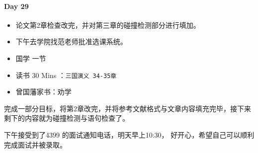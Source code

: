 \documentclass[UTF8,a4paper,8pt]{ctexart}
\begin{document}
 	 \paragraph{Day 29      \quad     }   
	 	 \begin{itemize}[itemindent = 1em]
	 	 	\renewcommand\labelitemi{\makebox[0pt][l]{$\square$}\raisebox{.15ex}{\hspace{0.1em}$\checkmark$}}		
	 	 	
	 	 	\item    论文第2章检查改完，并对第三章的碰撞检测部分进行填加。
	 	 	\item    下午去学院找范老师批准选课系统。
	 	 	
	 	 	
	 	 	\renewcommand\labelitemi{\makebox[0pt][l]{$\square$}\hspace{1em}}
	 	 	\item   国学  一节
	 	 	\item   读书  30 Mins	：\verb|三国演义 34-35章|
	 	 	\item   曾国藩家书：劝学
	 	 \end{itemize}
	 	 
		 完成一部分目标，将第2章改完，并将参考文献格式与文章内容填充完毕，接下来剩下的内容就为碰撞检测与语句检查了。
		 
		 下午接受到了4399 的面试通知电话，明天早上10:30， 好开心，希望自己可以顺利完成面试并被录取。
\end{document}
